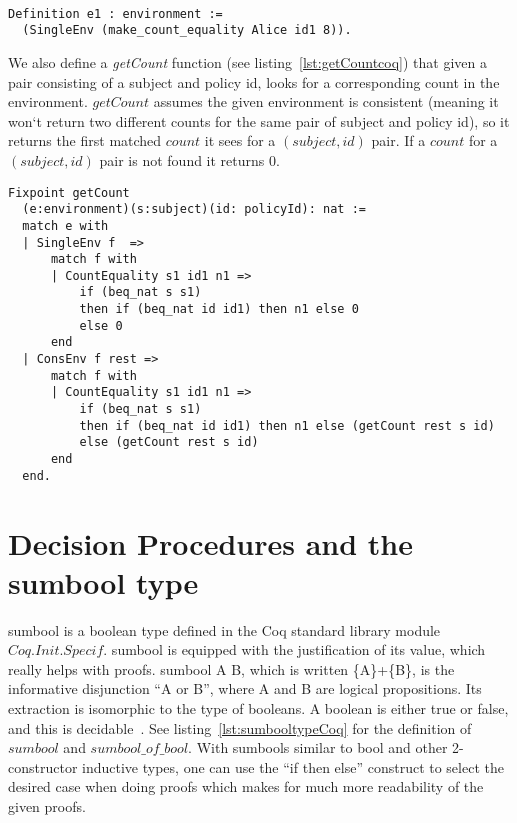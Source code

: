\begin{minipage}[c]{0.95\textwidth}
\begin{lstlisting}

Definition e1 : environment := 
  (SingleEnv (make_count_equality Alice id1 8)).

\end{lstlisting}
\end{minipage}
  

We also define a \emph{getCount} function (see listing~\ref{lst:getCountcoq}) that given a pair consisting of a subject and policy id, looks for a corresponding count in the environment. $getCount$ assumes the given environment is consistent (meaning it won`t return two different counts for the same pair of subject and policy id), so it returns the first matched $count$ it sees for a $(subject, id)$ pair. If a $count$ for a $(subject, id)$ pair is not found it returns 0. 


\begin{minipage}[c]{0.95\textwidth}
\begin{lstlisting}
Fixpoint getCount 
  (e:environment)(s:subject)(id: policyId): nat :=
  match e with
  | SingleEnv f  => 
      match f with 
	  | CountEquality s1 id1 n1 => 
          if (beq_nat s s1) 
          then if (beq_nat id id1) then n1 else 0 
          else 0  
      end			
  | ConsEnv f rest =>
      match f with 
	  | CountEquality s1 id1 n1 => 
          if (beq_nat s s1)
          then if (beq_nat id id1) then n1 else (getCount rest s id)  
          else (getCount rest s id)
      end
  end.
\end{lstlisting}
\end{minipage}

\section{Decision Procedures and the sumbool type}

sumbool is a boolean type defined in the Coq standard library module $Coq.Init.Specif$. sumbool is equipped with the justification of its value, which really helps with proofs. sumbool A B, which is written \{A\}+\{B\}, is the informative disjunction ``A or B'', where A and B are logical propositions. Its extraction is isomorphic to the type of booleans. A boolean is either true or false, and this is decidable~\cite{Coq:manual}. See listing~\ref{lst:sumbooltypeCoq} for the definition of $sumbool$ and $sumbool\_of\_bool$. With sumbools similar to bool and other 2-constructor inductive types, one can use the ``if then else'' construct to select the desired case when doing proofs which makes for much more readability of the given proofs.


